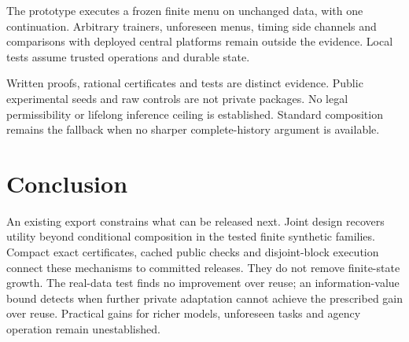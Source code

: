 \documentclass{article}
\begin{document}
The prototype executes a frozen finite menu on unchanged data, with one
continuation. Arbitrary trainers, unforeseen menus, timing side channels
and comparisons with deployed central platforms remain outside the
evidence. Local tests assume trusted operations and durable state.

Written proofs, rational certificates and tests are distinct evidence.
Public experimental seeds and raw controls are not private packages.
No legal permissibility or lifelong inference ceiling is established.
Standard composition remains the fallback when no sharper complete-history
argument is available.

\section{Conclusion}
\label{sec:conclusion}
An existing export constrains what can be released next. Joint design
recovers utility beyond conditional composition in the tested finite
synthetic families. Compact exact certificates, cached public checks and
disjoint-block execution connect these mechanisms to committed releases.
They do not remove finite-state growth. The real-data test finds no
improvement over reuse; an information-value bound detects when further
private adaptation cannot achieve the prescribed gain over reuse. Practical gains for
richer models, unforeseen tasks and agency operation remain unestablished.



\clearpage
\appendix









\end{document}
